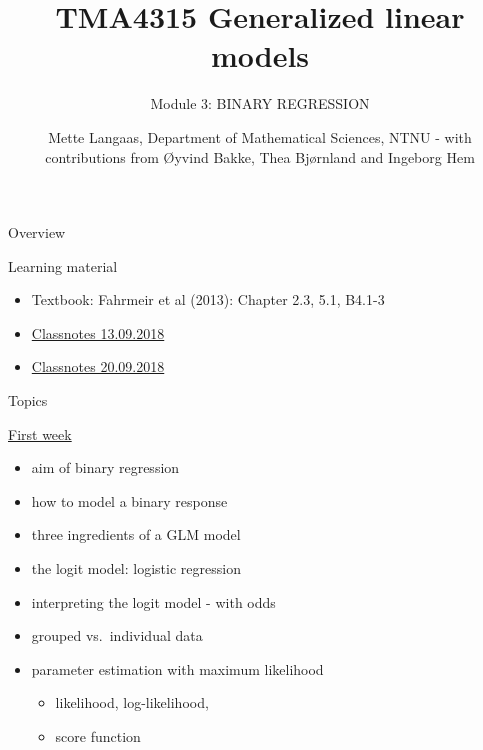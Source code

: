 \documentclass[
  ignorenonframetext,
]{beamer}
\title{TMA4315 Generalized linear models}
\subtitle{Module 3: BINARY REGRESSION}
\author{Mette Langaas, Department of Mathematical Sciences, NTNU - with
contributions from Øyvind Bakke, Thea Bjørnland and Ingeborg Hem}
\date{}
\providecommand{\tightlist}{%
  \setlength{\itemsep}{0pt}\setlength{\parskip}{0pt}}
\begin{document}
\frame{\titlepage}

\begin{frame}{Overview}
\protect\hypertarget{overview}{}
\begin{block}{Learning material}
\protect\hypertarget{learning-material}{}
\begin{itemize}
\tightlist
\item
  Textbook: Fahrmeir et al (2013): Chapter 2.3, 5.1, B4.1-3
\item
  \href{https://www.math.ntnu.no/emner/TMA4315/2018h/TMA4315M3H20180913.pdf}{Classnotes
  13.09.2018}
\item
  \href{https://www.math.ntnu.no/emner/TMA4315/2018h/TMA4315M3H20180920.pdf}{Classnotes
  20.09.2018}
\end{itemize}
\end{block}
\end{frame}

\begin{frame}
\begin{block}{Topics}
\protect\hypertarget{topics}{}
\begin{block}{\protect\hyperlink{firstweek}{First week}}
\protect\hypertarget{first-week}{}
\begin{itemize}
\tightlist
\item
  aim of binary regression
\item
  how to model a binary response
\item
  three ingredients of a GLM model
\item
  the logit model: logistic regression
\item
  interpreting the logit model - with odds
\item
  grouped vs.~individual data
\item
  parameter estimation with maximum likelihood

  \begin{itemize}
  \tightlist
  \item
    likelihood, log-likelihood,
  \item
    score function
  \end{itemize}
\end{itemize}
\end{block}
\end{block}
\end{frame}
\end{document}
